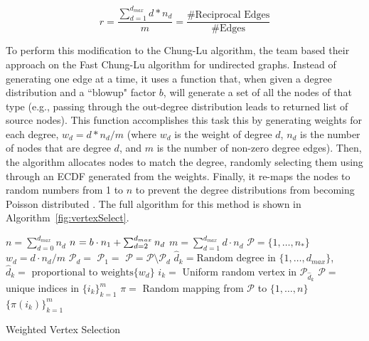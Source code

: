 \documentclass[pdftex,11pt,a4paper,twocolumn]{scrartcl}
\begin{document}
\small
$$r = \frac{\sum_{d=1}^{d_{max}} d*n_d}{m} = \frac{\text{\# Reciprocal Edges}}{\text{\# Edges}}$$
\normalsize

To perform this modification to the Chung-Lu algorithm, the team based their approach on the Fast Chung-Lu algorithm for undirected graphs. Instead of generating one edge at a time, it uses a function that, when given a degree distribution and a ``blowup" factor $b$, will generate a set of all the nodes of that type (e.g., passing through the out-degree distribution leads to returned list of source nodes). This function accomplishes this task this by generating weights for each degree, $w_d = d*n_d/m$ (where $w_d$ is the weight of degree $d$, $n_d$ is the number of nodes that are degree $d$, and $m$ is the number of non-zero degree edges). Then, the algorithm allocates nodes to match the degree, randomly selecting them using through an ECDF generated from the weights. Finally, it re-maps the nodes to random numbers from 1 to $n$ to prevent the degree distributions from becoming Poisson distributed \cite{FRDG}. The full algorithm for this method is shown in Algorithm~\ref{fig:vertexSelect}. 

\begin{algorithm}[width=\columnwidth, b]
\begin{minipage}{\columnwidth}
\begin{algorithmic} 
    \STATE $n = \sum_{d=0}^{d_{max}} n_d$
    \STATE $n_{\*} = b \cdot n_1 + \sum_{d=2}^{d_{max}} n_d$
    \STATE $m = \sum_{d=1}^{d_{max}} d \cdot n_d$
    \STATE $\mathcal{P} = \{1,\dots,n_*\}$
    \STATE $w_d = d \cdot n_d / m$
    \STATE $\mathcal{P}_d = $
    \ELSE
    \STATE $\mathcal{P}_1 = $
    \ENDIF
    \STATE $\mathcal{P} = \mathcal{P} \setminus \mathcal{P}_d$
    \ENDFOR
    \STATE $\hat d_k =\mbox{Random degree in }\{1,\dots,d_{max}\}$,
    \STATE $\hat d_k =\mbox{ proportional to weights}\{w_d\}$
    \STATE $i_k =$ Uniform random vertex in $\mathcal{P}_{\hat d_k}$
    \ENDFOR
    \STATE $\mathcal{P} =$ unique indices in $\{i_k\}_{k=1}^m$
    \STATE $\pi = $ Random mapping from $\mathcal{P}$ to $\{1,\dots,n\}$
    \RETURN $\{\pi(i_k)\}_{k=1}^{m}$
  \end{algorithmic}
  \caption{Weighted Vertex Selection\cite{FRDG}}
\label{fig:vertexSelect}
\end{minipage}
\end{algorithm}
\end{document}
